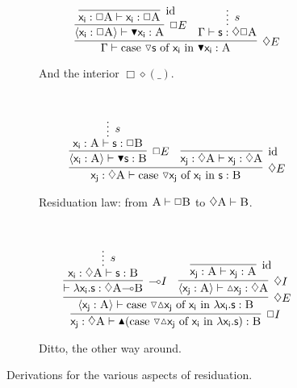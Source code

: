 \begin{figure}
\begin{subfigure}{0.4\textwidth}
		\label{subfigure:modal_properties:closure}
	\end{subfigure}%
	\begin{subfigure}{0.5\textwidth}
		\[
		\infer[\diamond E]{\Gamma \vdash \cterm{case \term{\diaelim{s}} of \term{x_i} in \term{\boxelim x_i}}: \prop{A}}{
						\infer[\Box E]{\bracket{\term{x_i}: \Box \prop{A}}\vdash \boxelim\term{x_i}:\prop{A}}{
							\infer[\Ax]{\term{x_i}: \Box\prop{A} \vdash \term{x_i}: \Box\prop{A}}{}
						}
						&
						\infer*[s]{\Gamma\vdash \term{s}: \diamond \Box \prop{A}}{}
				}
		\]
		\caption{And the interior $\Box\diamond(\_)$.}
		\label{subfigure:modal_properties:interior}
	\end{subfigure}\\[\midsep]
	\begin{subfigure}{1\textwidth}
		\[
			\infer[\diamond E]{\term{x_j}: \diamond \prop{A} \vdash \caseof{\diaelim x_j}{x_i}{s}:\prop{B}}{
				\infer[\Box E]{\bracket{\term{x_i}: \prop{A}} \vdash \boxelim\term{s}: \prop{B}}{
					\infer*[s]{\term{x_i}: \prop{A} \vdash \term{s}: \Box\prop{B}}{}
				}
				&
				\infer[\Ax]{\term{x_j}: \diamond \prop{A} \vdash \term{x_j}: \diamond \prop{A}}{}
			}
		\]
	\caption{Residuation law: from $\smallprop{A} \vdash \Box\smallprop{B}$ to $\diamond\smallprop{A} \vdash \smallprop{B}$.}
	\label{subfigure:modal_properties:residuation:1}	
	\end{subfigure}\\[\midsep]
	\begin{subfigure}{1\textwidth}
		\[
			\infer[\Box I]{\term{x_j}: \diamond \prop{A} \vdash \boxintro(\caseof{\diaelim \diaintro x_j}{x_i}{\lambda x_i.s}): \prop{B}}{
				\infer[\diamond E]{\bracket{\term{x_j}: \prop{A}} \vdash \caseof{\diaelim \diaintro x_j}{x_i}{\lambda x_i.s}: \prop{B}}{
					\infer[\li I]{\vdash \term{\lambda x_i.s}: \diamond\prop{A} \li \prop{B}}{
						\infer*[s]{\term{x_i}: \diamond\prop{A} \vdash \term{s}: \prop{B}}{}
					}
					&
					\infer[\diamond I]{\bracket{\term{x_j}: \prop{A}} \vdash \term{\diaintro x_j}: \diamond \prop{A}}{
						\infer[\Ax]{\term{x_j}: \prop{A} \vdash \term{x_j}: \prop{A}}{}
					}
				}
			}
		\]
		\caption{Ditto, the other way around.}
		\label{subfigure:modal_properties:residuation:2}	
	\end{subfigure}
	\caption{Derivations for the various aspects of residuation.}
	\label{figure:modal_properties:residuation}
\end{figure}

